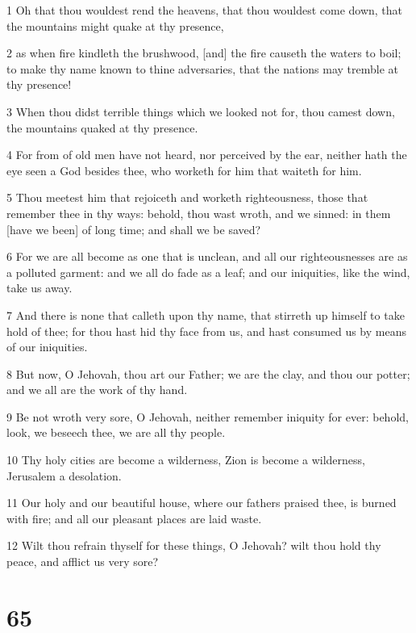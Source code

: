 \par 1 Oh that thou wouldest rend the heavens, that thou wouldest come down, that the mountains might quake at thy presence,
\par 2 as when fire kindleth the brushwood, [and] the fire causeth the waters to boil; to make thy name known to thine adversaries, that the nations may tremble at thy presence!
\par 3 When thou didst terrible things which we looked not for, thou camest down, the mountains quaked at thy presence.
\par 4 For from of old men have not heard, nor perceived by the ear, neither hath the eye seen a God besides thee, who worketh for him that waiteth for him.
\par 5 Thou meetest him that rejoiceth and worketh righteousness, those that remember thee in thy ways: behold, thou wast wroth, and we sinned: in them [have we been] of long time; and shall we be saved?
\par 6 For we are all become as one that is unclean, and all our righteousnesses are as a polluted garment: and we all do fade as a leaf; and our iniquities, like the wind, take us away.
\par 7 And there is none that calleth upon thy name, that stirreth up himself to take hold of thee; for thou hast hid thy face from us, and hast consumed us by means of our iniquities.
\par 8 But now, O Jehovah, thou art our Father; we are the clay, and thou our potter; and we all are the work of thy hand.
\par 9 Be not wroth very sore, O Jehovah, neither remember iniquity for ever: behold, look, we beseech thee, we are all thy people.
\par 10 Thy holy cities are become a wilderness, Zion is become a wilderness, Jerusalem a desolation.
\par 11 Our holy and our beautiful house, where our fathers praised thee, is burned with fire; and all our pleasant places are laid waste.
\par 12 Wilt thou refrain thyself for these things, O Jehovah? wilt thou hold thy peace, and afflict us very sore?

\chapter{65}

